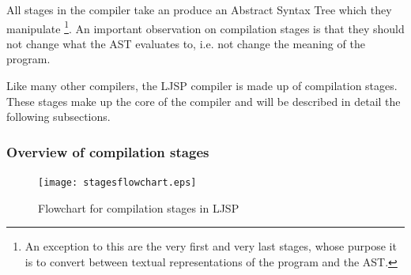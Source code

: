 \documentclass[11pt]{report}
\begin{document}
All stages in the compiler take an produce an Abstract Syntax Tree which they manipulate \footnote{An exception to this are the very first and very last stages, whose purpose it is to convert between textual representations of the program and the AST.}. An important observation on compilation stages is that they should not change what the AST evaluates to, i.e. not change the meaning of the program.

Like many other compilers, the LJSP compiler is made up of compilation stages. These stages make up the core of the compiler and will be described in detail the following subsections.

\subsubsection{Overview of compilation stages}


\begin{figure}[ht]
\begin{center}
\texttt{[image: stagesflowchart.eps]}
\caption{Flowchart for compilation stages in LJSP}
\end{center}
\label{stagesflowchart}
\end{figure}
\end{document}
